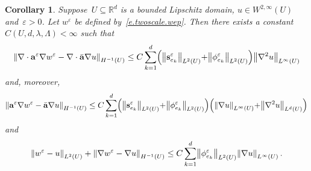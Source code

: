\documentclass[11pt]{article} %
\numberwithin{equation}{section}
\newtheorem{corollary}[theorem]{Corollary}
\theoremstyle{definition}
\let\originalleft\left
\let\originalright\right
\renewcommand{\left}{\mathopen{}\mathclose\bgroup\originalleft}
\renewcommand{\right}{\aftergroup\egroup\originalright}
\newcommand*{\Rd}{\ensuremath{\mathbb{R}^d}}
\newcommand{\eps}{\varepsilon}
\newcommand{\s}{\mathbf{s}}
\newcommand{\ep}{\eps}
\renewcommand{\a}{\mathbf{a}}
\newcommand{\ahom}{\bar{\a}}
\begin{document}
\begin{corollary} \label{c.twoscale}
Suppose~$U\subseteq\Rd$ is a bounded Lipschitz domain, $u\in W^{2,\infty}(U)$ and~$\ep >0$. Let $w^\ep$ be defined by~\eqref{e.twoscale.wep}. 
Then there exists a constant~$C(U,d,\lambda,\Lambda)<\infty$ such that
\begin{align}
\label{e.twoscale.explicit}
\left\|
\nabla \cdot \a^\ep \nabla w^\ep 
-
\nabla\cdot \ahom \nabla u
\right\|_{H^{-1}(U)}  
\leq
C 
\sum_{k=1}^d 
\left( \left\| \s_{e_k}^\ep  \right\|_{L^2(U)} {+} \left\| \phi_{e_k}^\ep  \right\|_{L^2(U)}   \right)
\left\| \nabla^2 u \right\|_{L^{\infty}(U)}
\end{align}
and, moreover,  
\begin{align} \label{e.twoscale.explicit2}
\left\| 
\a^\ep \nabla w^\ep - \ahom \nabla u \right\|_{H^{-1}(U)} 
\leq 
C \sum_{k=1}^d 
\left( \left\| \s_{e_k}^\ep  \right\|_{L^2(U)} {+} \left\| \phi_{e_k}^\ep  \right\|_{L^2(U)}   \right) 
\left(\left\| \nabla u \right\|_{L^{\infty}(U)}  {+} \left\| \nabla^2 u \right\|_{L^{d}(U)} \right)
\end{align}
and 
\begin{align}
\label{e.twoscale.strip}
\left\| 
w^\ep - u 
\right\|_{L^2(U)} 
+
\left\| 
\nabla w^\ep - \nabla u \right\|_{H^{-1}(U)} 
\leq
C  \sum_{k=1}^d 
\left\| \phi_{e_k}^\ep  \right\|_{L^2(U)} 
\left\| \nabla u \right\|_{L^\infty(U)} \,.
\end{align}
\end{corollary}
\end{document}
